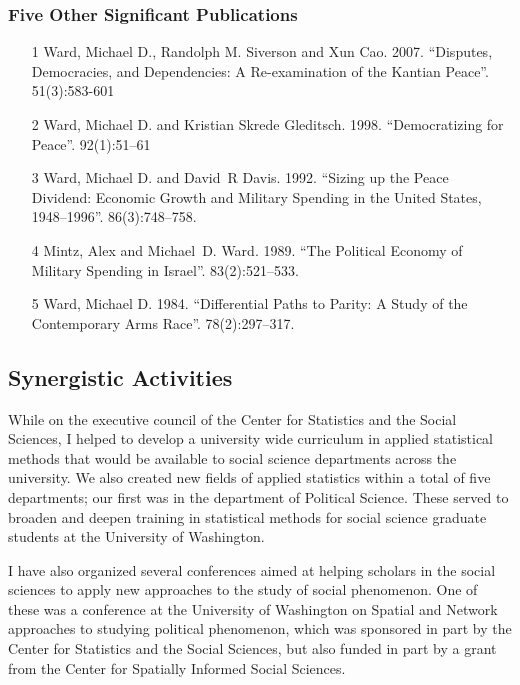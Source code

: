 \documentclass[pdftex,12pt,fullpage,oneside]{amsart}
\begin{document}
\subsubsection*{Five Other Significant Publications}
\begin{itemize}

\item[1]  Ward, Michael D., Randolph M. Siverson and Xun Cao. 2007. ``Disputes, Democracies, and Dependencies: A Re-examination of the Kantian Peace''.  51(3):583-601
   
\item[2]
Ward, Michael D. and Kristian Skrede Gleditsch. 1998. ``Democratizing for Peace''.  92(1):51--61
 
 \item[3] Ward, Michael D. and David~R Davis. 1992. ``Sizing up the Peace Dividend: Economic Growth and Military Spending
  in the {United States}, 1948--1996''.  86(3):748--758.
 
 \item[4]
Mintz, Alex and Michael~D. Ward. 1989. ``The Political Economy of Military Spending in {I}srael''.
 83(2):521--533.

\item[5]
Ward, Michael D. 1984. ``Differential Paths to Parity: A Study of the Contemporary Arms Race''.
 78(2):297--317.

\end{itemize}
\subsection*{Synergistic Activities}
While on the executive council of the Center for Statistics and the
Social Sciences, I helped to develop a university wide curriculum in
applied statistical methods that would be available to social science
departments across the university. We also created new fields of
applied statistics within a total of five departments; our first was
in the department of Political Science. These served to broaden and
deepen training in statistical methods for social science graduate
students at the University of Washington.

I have also organized several conferences aimed at helping scholars in
the social sciences to apply new approaches to the study of social
phenomenon. One of these was a conference at the University of
Washington on Spatial and Network approaches to studying political
phenomenon, which was sponsored in part by the Center for Statistics
and the Social Sciences, but also funded in part by a grant from the
Center for Spatially Informed Social Sciences.
\end{document}
